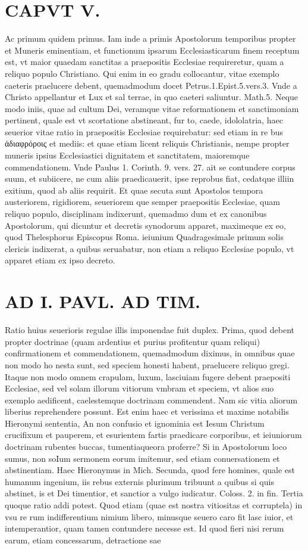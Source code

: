 \documentclass{article}
\begin{document}
\begin{pages}
\section*{CAPVT V. }
\marginpar{[ p.37 ]}\pstart Ac primum quidem primus. Iam inde a primis Apostolorum temporibus propter et Muneris eminentiam, et functionum ipsarum Ecclesiasticarum finem receptum est, vt maior quaedam sanctitas a praepositis Ecclesiae requireretur, quam a reliquo populo Christiano. Qui enim in eo gradu collocantur, vitae exemplo caeteris praelucere debent, quemadmodum docet Petrus.1.Epist.5.vers.3. Vnde a Christo appellantur et Lux et sal terrae, in quo caeteri saliuntur. Math.5. Neque modo iniis, quae ad cultum Dei, veramque vitae reformationem et sanctimoniam pertinent, quale est vt scortatione abstineant, fur to, caede, idololatria, haec seuerior vitae ratio in praepositis Ecclesiae requirebatur: sed etiam in re bus ἀδιαφρόροις et mediis: et quae etiam licent reliquis Christianis, nempe propter muneris ipsius Ecclesiastici dignitatem et sanctitatem, maioremque commendationem. Vnde Paulus 1. Corinth. 9. vers. 27. ait se contundere corpus suum, et subiicere, ne cum aliis praedicauerit, ipse reprobus fiat, cedatque illiin exitium, quod ab aliis requirit. Et quae secuta sunt Apostolos tempora austeriorem, rigidiorem, seueriorem que semper praepositis Ecclesiae, quam reliquo populo, disciplinam indixerunt, quemadmo dum et ex canonibus Apostolorum, qui dicuntur et decretis synodorum apparet, maximeque ex eo, quod Thelesphorus Episcopus Roma. ieiunium Quadragesimale primum solis clericis indixerat, a quibus seruabatur, non etiam a reliquo Ecclesiae populo, vt apparet etiam ex ipso decreto.  \pend
\section*{AD I. PAVL. AD TIM. }
\marginpar{[ p.372 ]}\pstart Ratio huius seuerioris regulae illis imponendae fuit duplex. Prima, quod debent propter doctrinae (quam ardentius et purius profitentur quam reliqui) confirmationem et commendationem, quemadmodum diximus, in omnibus quae non modo ho nesta sunt, sed speciem honesti habent, praelucere reliquo gregi. Itaque non modo omnem crapulam, luxum, lasciuiam fugere debent praepositi Ecclesiae, sed vel solam illorum vitiorum vmbram et speciem, vt alios suo exemplo aedificent, caelestemque doctrinam commendent. Nam sic vitia aliorum liberius reprehendere possunt. Est enim haec et verissima et maxime notabilis Hieronymi sententia, An non confusio et ignominia est Iesum Christum crucifixum et pauperem, et esurientem fartis praedicare corporibus, et ieiuniorum doctrinam rubentes buccas, tumentiaqueora proferre? Si in Apostolorum loco sumus, non soIum sermonem eorum imitemur, sed etiam conuersationem et abstinentiam. Haec Hieronymus in Mich. Secunda, quod fere homines, quale est humanum ingenium, iis rebus externis plurimum tribuunt a quibus si quis abstinet, is et Dei timentior, et sanctior a vulgo iudicatur. Coloss. 2. in fin. Tertia quoque ratio addi potest. Quod etiam (quae est nostra vitiositas et corruptela) in vsu re rum indifferentium nimium libero, minusque seuero caro fit lasc iuior, et intemperantior, quam tamen contundere necesse est. Id quod fieri nisi rerum earum, etiam concessarum, detractione sae  \pend

\end{pages}
\end{document}

